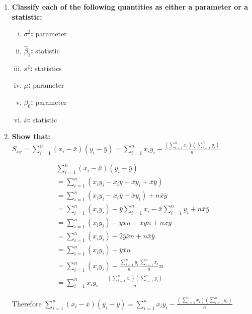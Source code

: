 \documentclass{article}
\begin{document}
\begin{enumerate}[1.]
\item
\textbf{Classify each of the following quantities as either a parameter or a statistic:}
\begin{enumerate}[(i)]
  \item \textbf{$\sigma^2$: } parameter
  \item \textbf{$\hat{\beta}_1$: } statistic
  \item \textbf{$s^2$: } statistics
  \item \textbf{$\mu$: } parameter
  \item \textbf{$\beta_0$: } parameter
  \item \textbf{$\bar{x}$: } statistic
\end{enumerate}

\item
\textbf{Show that:} \\
$S_{xy} = \sum_{i=1}^{n}(x_i - \bar{x})(y_i - \bar{y}) = \sum_{i=1}^{n}x_iy_i - \frac{(\sum_{i=1}^{n}x_i)(\sum_{i=1}^{n}y_i)}{n}$

\begin{gather*}
\sum_{i=1}^{n}(x_i - \bar{x})(y_i - \bar{y}) \\
= \sum_{i = 1}^{n}(x_iy_i - x_i\bar{y} - \bar{x}y_i + \bar{x}\bar{y}) \\
= \sum_{i = 1}^{n}(x_iy_i - x_i\bar{y} - \bar{x}y_i) + n\bar{x}\bar{y} \\
= \sum_{i = 1}^{n}(x_iy_i) - \bar{y}\sum_{i=1}^{n}x_i - \bar{x}\sum_{i=1}^{n}y_i + n\bar{x}\bar{y} \\
= \sum_{i = 1}^{n}(x_iy_i) - \bar{y}\bar{x}n - \bar{x}\bar{y}n + n\bar{x}\bar{y} \\
= \sum_{i = 1}^{n}(x_iy_i) - 2\bar{y}\bar{x}n + n\bar{x}\bar{y} \\
= \sum_{i = 1}^{n}(x_iy_i) - \bar{y}\bar{x}n \\
= \sum_{i = 1}^{n}(x_iy_i) - \frac{\sum_{i=1}^{n}y_i}{n}\frac{\sum_{i=1}^{n}x_i}{n}n \\
= \sum_{i=1}^{n}x_iy_i - \frac{(\sum_{i=1}^{n}x_i)(\sum_{i=1}^{n}y_i)}{n}
\end{gather*}

Therefore $\sum_{i=1}^{n}(x_i - \bar{x})(y_i - \bar{y}) = \sum_{i=1}^{n}x_iy_i - \frac{(\sum_{i=1}^{n}x_i)(\sum_{i=1}^{n}y_i)}{n}$

\end{enumerate}
\end{document}
